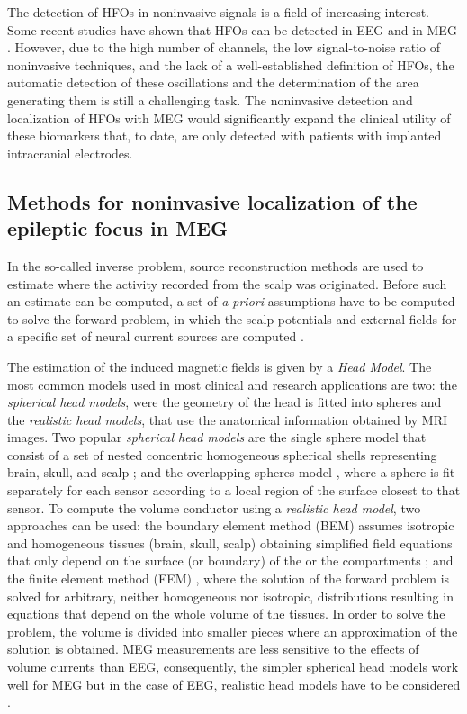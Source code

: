 The detection of HFOs in noninvasive signals is a field of increasing interest. Some recent studies have shown that HFOs can be detected in EEG \citep{Papadelis2016,Andrade-Valenca2011,Kobayashi2010,Zelmann2014} and in MEG \citep{vanKlink2015,vonEllenrieder2016,Nissen2016}. However, due to the high number of channels, the low signal-to-noise ratio of noninvasive techniques, and the lack of a well-established definition of HFOs, the automatic detection of these oscillations and the determination of the area generating them is still a challenging task. The noninvasive detection and localization of HFOs with MEG would significantly expand the clinical utility of these biomarkers that, to date, are only detected with patients with implanted intracranial electrodes.  

\subsection{Methods for noninvasive localization of the epileptic focus in MEG}

In the so-called inverse problem, source reconstruction methods are used to estimate where the activity recorded from the scalp was originated. Before such an estimate can be computed, a set of \emph{a priori} assumptions have to be computed to solve the forward problem, in which the scalp potentials and external fields for a specific set of neural current sources are computed \citep{Baillet2001}. 

The estimation of the induced magnetic fields is given by a \emph{Head Model}. The most common models used in most clinical and research applications are two: the \emph{spherical head models}, were the geometry of the head is fitted into spheres and the \emph{realistic head models}, that use the anatomical information obtained by MRI images. Two popular \textit{spherical head models} are the single sphere model \citep{Cuffin1977} that consist of a set of nested concentric homogeneous spherical shells representing brain, skull, and scalp \citep{Mosher1999,Zhang1995};  and the overlapping spheres model \citep{Huang1999}, where a sphere is fit separately for each sensor according to a local region of the surface closest to that sensor. To compute the volume conductor using a \textit{realistic head model},  two approaches can be used: the boundary element method (BEM) assumes isotropic and homogeneous tissues (brain, skull, scalp) obtaining simplified field equations that only depend on the surface (or boundary) of the  or the compartments \citep{Nolte2003}; and the finite element method (FEM) \citep{Ermer2001}, where the solution of the forward problem is solved for arbitrary, neither homogeneous nor isotropic, distributions resulting in equations that depend on the whole volume of the tissues. In order to solve the problem, the volume is divided into smaller pieces where an approximation of the solution is obtained. MEG measurements are less sensitive to the effects of volume currents than EEG, consequently, the simpler spherical head models work well for MEG but in the case of EEG, realistic head models have to be considered \citep{Baillet2001}.


